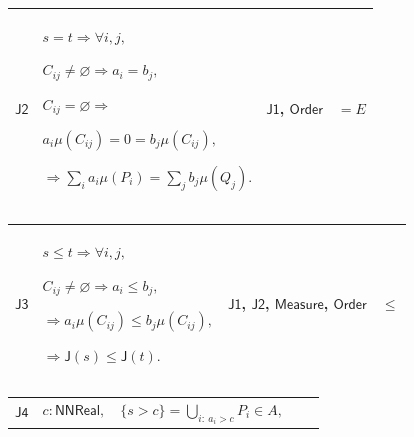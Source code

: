 \documentclass[11pt]{amsart}
\newlength{\FTCFourColumnBody}
\begin{document}
{\noindent
\begin{tabular}{|@{}>{\centering\arraybackslash}m{0.078431\FTCFourColumnBody}|>{\centering\arraybackslash}m{0.535947\FTCFourColumnBody}|>{\centering\arraybackslash}m{0.281045\FTCFourColumnBody}|>{\centering\arraybackslash}m{0.104575\FTCFourColumnBody}|}\hline
\hypertarget{proof:J2}{$\displaystyle \textsf{J2}$} & $\displaystyle s=t\Rightarrow\forall i,j,$\par
$\displaystyle C_{ij}\ne\varnothing\Rightarrow a_i=b_j,$\par
$\displaystyle C_{ij}=\varnothing\Rightarrow$\par
$\displaystyle a_i\mu(C_{ij})=0=b_j\mu(C_{ij}),$\par
$\displaystyle \Rightarrow\sum_i a_i\mu(P_i)=\sum_j b_j\mu(Q_j).$ & \hyperlink{proof:J1}{$\displaystyle \textsf{J1}$}, \hyperlink{ax:Order}{$\displaystyle \textsf{Order}$} & $\displaystyle =E$\\ \hline
\end{tabular}%
\par\setlength{\parskip}{0pt}\nointerlineskip
\noindent
\begin{tabular}{|@{}>{\centering\arraybackslash}m{0.078431\FTCFourColumnBody}|>{\centering\arraybackslash}m{0.535947\FTCFourColumnBody}|>{\centering\arraybackslash}m{0.281045\FTCFourColumnBody}|>{\centering\arraybackslash}m{0.104575\FTCFourColumnBody}|}\hline
\hypertarget{proof:J3}{$\displaystyle \textsf{J3}$} & $\displaystyle s\le t\Rightarrow\forall i,j,$\par
$\displaystyle C_{ij}\ne\varnothing\Rightarrow a_i\le b_j,$\par
$\displaystyle \Rightarrow a_i\mu(C_{ij})\le b_j\mu(C_{ij}),$\par
$\displaystyle \Rightarrow\textsf{J}(s)\le\textsf{J}(t).$ & \hyperlink{proof:J1}{$\displaystyle \textsf{J1}$}, \hyperlink{proof:J2}{$\displaystyle \textsf{J2}$}, \hyperlink{ax:Measure}{$\displaystyle \textsf{Measure}$}, \hyperlink{ax:Order}{$\displaystyle \textsf{Order}$} & $\displaystyle \le$\\ \hline
\end{tabular}%
\par\setlength{\parskip}{0pt}\nointerlineskip
\noindent
\begin{tabular}{|@{}>{\centering\arraybackslash}m{0.078431\FTCFourColumnBody}|>{\centering\arraybackslash}m{0.535947\FTCFourColumnBody}|>{\centering\arraybackslash}m{0.281045\FTCFourColumnBody}|>{\centering\arraybackslash}m{0.104575\FTCFourColumnBody}|}\hline
\hypertarget{proof:J4}{$\displaystyle \textsf{J4}$} & $\displaystyle c:\textsf{NNReal},\quad\{s>c\}=\bigcup_{i:\ a_i>c}P_i\in A,$\par

\end{tabular}}
\end{document}
